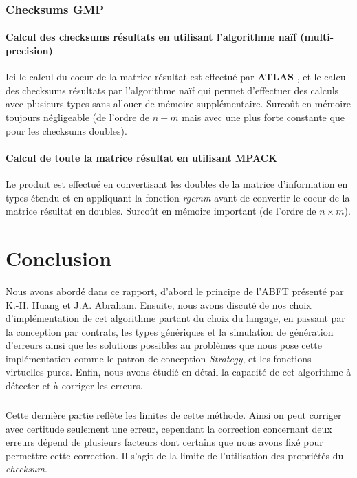 \documentclass[a4paper, 10pt]{report}
\begin{document}
\subsection{Checksums GMP}
\subsubsection{Calcul des checksums résultats en utilisant l'algorithme naïf (multi-precision)}
Ici le calcul du coeur de la matrice résultat est effectué par \textbf{ATLAS} \cite{ATLAS},
et le calcul des checksums résultats par l'algorithme naïf qui permet d'effectuer des calculs avec plusieurs types
sans allouer de mémoire supplémentaire.\newline
Surco\^ut en mémoire toujours négligeable (de l'ordre de $n + m$ mais avec une plus forte constante que pour les checksums doubles).

\subsubsection{Calcul de toute la matrice résultat en utilisant \textbf{MPACK} \cite{MPACK}}
Le produit est effectué en convertisant les doubles de la matrice d'information en types étendu et en appliquant la fonction \textit{rgemm}
avant de convertir le coeur de la matrice résultat en doubles.\newline
Surco\^ut en mémoire important (de l'ordre de $n \times m$).


\chapter*{Conclusion}
Nous avons abordé dans ce rapport, d'abord le principe de l'ABFT \cite{Huang} présenté par K.-H. Huang et J.A. Abraham. Ensuite, nous avons
discuté de nos choix d'implémentation de cet algorithme partant du choix du langage, en passant par la conception par contrats,
les types génériques et la simulation de génération d'erreurs ainsi que les solutions possibles au problèmes que nous pose cette
implémentation comme le patron de conception \textit{Strategy}, et les fonctions virtuelles pures. Enfin, nous avons étudié en 
détail la capacité de cet algorithme à détecter et à corriger les erreurs.
\paragraph*{}
Cette dernière partie reflète les limites de cette méthode. Ainsi on peut corriger avec certitude seulement une erreur,
cependant la correction concernant deux erreurs dépend de plusieurs facteurs dont certains que nous avons fixé pour permettre
cette correction. Il s'agit de la limite de l'utilisation des propriétés du \textit{checksum}.
\end{document}
